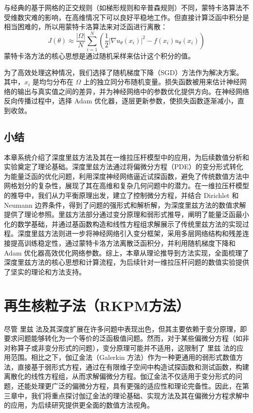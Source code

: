 \documentclass[engineeringmaster]{hquThesis}
\begin{document}
与经典的基于网格的正交规则（如梯形规则和辛普森规则）不同，蒙特卡洛算法不受维数灾难的影响，在高维情况下可以良好平稳地工作。但直接计算泛函中积分是相当困难的，所以用蒙特卡洛算法来对泛函进行离散：
\begin{equation}
    J(\theta) \approx \frac{|\Omega|}{N} \sum_{i=1}^N \left( \frac{1}{2} |\nabla u_{\theta}(x_i)|^2 - f(x_i) u_{\theta}(x_i) \right)
    \label{eq:monte_carlo}
    \end{equation}
蒙特卡洛方法的核心思想是通过随机采样来估计这个积分的值。

为了高效处理这种情况，我们选择了随机梯度下降（SGD）方法作为解决方案。其中，\( x_i \) 是均匀分布在 \( \Omega \) 上的独立同分布随机变量。损失函数被用来估计神经网络的输出与真实值之间的差异，并为神经网络中的参数优化提供方向。在神经网络反向传播过程中，选择 Adam 优化器，逐层更新参数，使损失函数逐渐减小，直到收敛。
\section{小结}

本章系统介绍了深度里兹方法及其在一维拉压杆模型中的应用，为后续数值分析和实验奠定了理论基础。深度里兹方法通过将偏微分方程（PDE）的变分形式转化为能量泛函的优化问题，利用深度神经网络逼近试探函数，避免了传统数值方法中网格划分的复杂性，展现了其在高维和复杂几何问题中的潜力。在一维拉压杆模型的推导中，我们从力平衡原理出发，建立了控制微分方程，并结合 Dirichlet 和 Neumann 边界条件，得到了问题的强形式和解析解，为深度里兹方法的数值求解提供了理论参照。里兹方法部分通过变分原理和弱形式推导，阐明了能量泛函最小化的数学基础，并通过基函数构造和线性方程组求解展示了传统里兹方法的实现过程。深度里兹方法则进一步将神经网络引入变分框架，采用多层网络结构和残差连接提高训练稳定性，通过蒙特卡洛方法离散泛函积分，并利用随机梯度下降和 Adam 优化器高效优化网络参数。综上，本章从理论推导到方法实现，全面梳理了深度里兹方法的核心思想和计算流程，为后续针对一维拉压杆问题的数值实验提供了坚实的理论和方法支持。




\chapter{再生核粒子法（RKPM方法）}

尽管 里兹 法及其深度扩展在许多问题中表现出色，但其主要依赖于变分原理，即要求问题能够转化为一个等价的泛函极值问题。然而，对于某些偏微分方程（如非对称算子或非变分形式的问题），变分原理可能并不适用，这限制了 里兹 法的应用范围。相比之下，伽辽金法（Galerkin 方法）作为一种更通用的弱形式数值方法，直接基于弱形式方程，通过在有限维子空间中构造试探函数和测试函数，构建离散化的线性方程组，从而求解偏微分方程。伽辽金法不仅适用于变分形式的问题，还能处理更广泛的偏微分方程，具有更强的适应性和理论完备性。因此，在第三章中，我们将重点探讨伽辽金法的理论基础、实现方法及其在偏微分方程求解中的应用，为后续研究提供更全面的数值方法视角。
\end{document}
